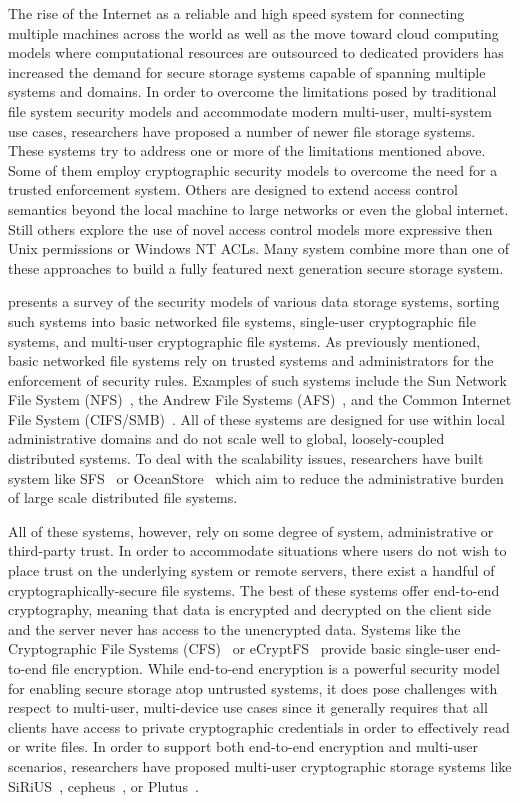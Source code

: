 The rise of the Internet as a reliable and high speed system for
connecting multiple machines across the world as well as the move
toward cloud computing models where computational resources are
outsourced to dedicated providers has increased the demand for secure
storage systems capable of spanning multiple systems and domains. In
order to overcome the limitations posed by traditional file system
security models and accommodate modern multi-user, multi-system use
cases, researchers have proposed a number of newer file storage
systems. These systems try to address one or more of the limitations
mentioned above. Some of them employ cryptographic security models to
overcome the need for a trusted enforcement system. Others are
designed to extend access control semantics beyond the local machine
to large networks or even the global internet. Still others explore
the use of novel access control models more expressive then Unix
permissions or Windows NT ACLs. Many system combine more than one of
these approaches to build a fully featured next generation secure
storage system.

\cite{kher2005} presents a survey of the security models of various
data storage systems, sorting such systems into basic networked file
systems, single-user cryptographic file systems, and multi-user
cryptographic file systems. As previously mentioned, basic networked
file systems rely on trusted systems and administrators for the
enforcement of security rules. Examples of such systems include the
Sun Network File System (NFS)~\cite{sandberg1985}, the Andrew File
Systems (AFS)~\cite{howard1988}, and the Common Internet File System
(CIFS/SMB)~\cite{microsoft-smb2}. All of these systems are designed
for use within local administrative domains and do not scale well to
global, loosely-coupled distributed systems. To deal with the
scalability issues, researchers have built system like
SFS~\cite{mazieres1999} or OceanStore~\cite{kubiatowicz2000} which aim
to reduce the administrative burden of large scale distributed file
systems.

All of these systems, however, rely on some degree of system,
administrative or third-party trust. In order to accommodate
situations where users do not wish to place trust on the underlying
system or remote servers, there exist a handful of
cryptographically-secure file systems. The best of these systems offer
end-to-end cryptography, meaning that data is encrypted and decrypted
on the client side and the server never has access to the unencrypted
data.  Systems like the Cryptographic File Systems
(CFS)~\cite{blaze1993} or eCryptFS~\cite{ecryptfs} provide basic
single-user end-to-end file encryption. While end-to-end encryption is
a powerful security model for enabling secure storage atop untrusted
systems, it does pose challenges with respect to multi-user,
multi-device use cases since it generally requires that all clients
have access to private cryptographic credentials in order to
effectively read or write files. In order to support both end-to-end
encryption and multi-user scenarios, researchers have proposed
multi-user cryptographic storage systems like SiRiUS~\cite{goh2003},
cepheus~\cite{fu1998}, or Plutus~\cite{kallahalla2003}.

